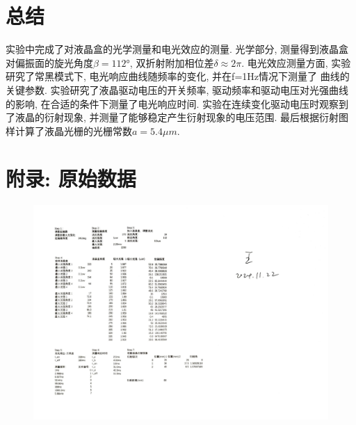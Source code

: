 \documentclass[12pt,a4paper]{article}
\begin{document}
\section{总结}
实验中完成了对液晶盒的光学测量和电光效应的测量. 光学部分, 测量得到液晶盒对偏振面的旋光角度$\beta=112°$, 双折射附加相位差$\delta \approx 2\pi$. 电光效应测量方面, 实验研究了常黑模式下, 电光响应曲线随频率的变化, 并在f=1Hz情况下测量了
曲线的关键参数. 实验研究了液晶驱动电压的开关频率, 驱动频率和驱动电压对光强曲线的影响, 在合适的条件下测量了电光响应时间. 实验在连续变化驱动电压时观察到了液晶的衍射现象, 并测量了能够稳定产生衍射现象的电压范围. 最后根据衍射图样计算了液晶光栅的光栅常数$a=5.4\mu m$. 

\section{附录: 原始数据}
\begin{figure}[H]
    \centering
    \includegraphics[width=1.5\textwidth, angle=90]{Raw.jpg}
\end{figure}
\end{document}
